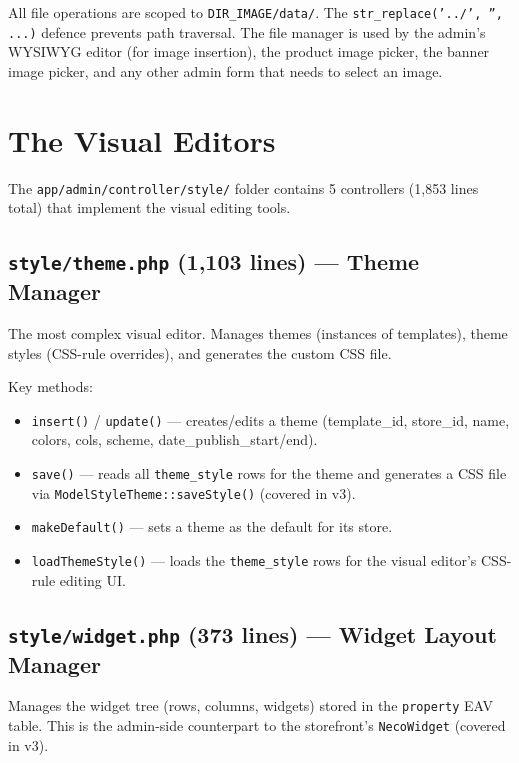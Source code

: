 \documentclass[11pt,a4paper]{article}
\begin{document}
All file operations are scoped to \texttt{DIR\_IMAGE/data/}. The
\texttt{str\_replace('../', '', ...)} defence prevents path traversal.
The file manager is used by the admin's WYSIWYG editor (for image
insertion), the product image picker, the banner image picker, and any
other admin form that needs to select an image.

\section{The Visual Editors}\label{sec:visual-editors}

The \texttt{app/admin/controller/style/} folder contains 5 controllers
(1,853 lines total) that implement the visual editing tools.

\subsection{\texttt{style/theme.php} (1,103 lines) --- Theme Manager}

The most complex visual editor. Manages themes (instances of templates),
theme styles (CSS-rule overrides), and generates the custom CSS file.

Key methods:
\begin{itemize}[leftmargin=1.6em,itemsep=2pt]
  \item \texttt{insert()} / \texttt{update()} --- creates/edits a theme
        (template\_id, store\_id, name, colors, cols, scheme,
        date\_publish\_start/end).
  \item \texttt{save()} --- reads all \texttt{theme\_style} rows for the
        theme and generates a CSS file via
        \texttt{ModelStyleTheme::saveStyle()} (covered in v3).
  \item \texttt{makeDefault()} --- sets a theme as the default for its
        store.
  \item \texttt{loadThemeStyle()} --- loads the \texttt{theme\_style}
        rows for the visual editor's CSS-rule editing UI.
\end{itemize}

\subsection{\texttt{style/widget.php} (373 lines) --- Widget Layout Manager}

Manages the widget tree (rows, columns, widgets) stored in the
\texttt{property} EAV table. This is the admin-side counterpart to the
storefront's \texttt{NecoWidget} (covered in v3).
\end{document}
